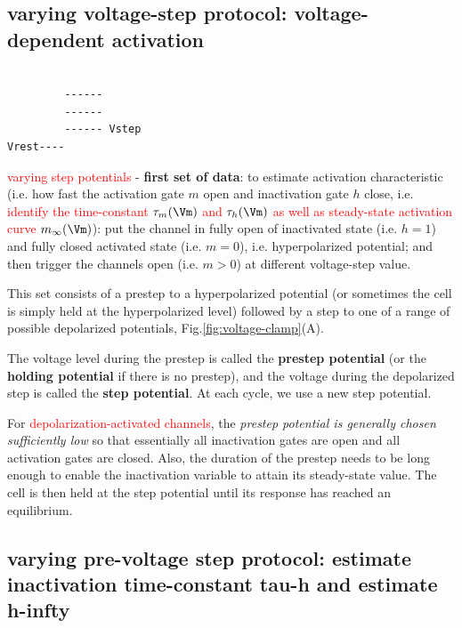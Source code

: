 
\subsection{varying voltage-step protocol: voltage-dependent activation}
\label{sec:voltage-clamp-protocol-varying-voltage-step}
\label{sec:voltage-step}

\begin{verbatim}

         ------
         ------
         ------ Vstep
Vrest----
\end{verbatim}

\textcolor{red}{varying step potentials} - {\bf first set of data}: to estimate
activation characteristic (i.e.
how fast the activation gate $m$ open and inactivation gate $h$ close, i.e.
\textcolor{red}{identify the time-constant $\tau_m(\Vm)$ and $\tau_h(\Vm)$ as
well as steady-state activation curve $m_\infty(\Vm)$}):
put the channel in fully open of inactivated state (i.e. $h=1$) and fully closed
activated state (i.e. $m=0$), i.e. hyperpolarized potential; and then trigger
the channels open (i.e. $m>0$) at different voltage-step value.

This set consists of a prestep to a hyperpolarized potential (or sometimes the
cell is simply held at the hyperpolarized level) followed by a step to one of a
range of possible depolarized potentials, Fig.\ref{fig:voltage-clamp}(A).

The voltage level during the prestep is called the {\bf prestep potential} (or
the {\bf holding potential} if there is no prestep), and the voltage during the
depolarized step is called the {\bf step potential}. At each cycle, we use a new
step potential.

For \textcolor{red}{depolarization-activated channels}, the {\it prestep
potential is generally chosen sufficiently low} so that essentially all
inactivation gates are open and all activation gates are closed.
Also, the duration of the prestep needs to be long enough to enable the
inactivation variable to attain its steady-state value. The cell is then held at
the step potential until its response has reached an equilibrium.


\subsection{varying pre-voltage step protocol: estimate inactivation
time-constant tau-h and estimate h-infty}
\label{sec:voltage-clamp-protocol-varying-pre-voltage-step}
\label{sec:voltage-clamp-protocol-estimate-inactivation-single-pulse}

